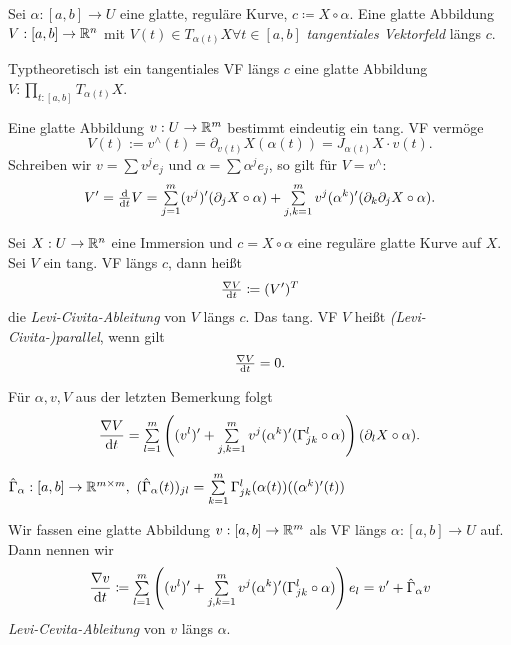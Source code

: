 \documentclass{cheat-sheet}
\let\myProd\prod
\DeclareMathOperator*{\textprod}{{\textstyle \myProd}}
\renewcommand{\prod}{\textprod}
\let\mySum\sum
\DeclareMathOperator*{\textsum}{{\textstyle \mySum}}
\renewcommand{\sum}{\textsum\limits}
\begin{document}

\begin{defn}
  Sei $\alpha : [a, b] \to U$ eine glatte, reguläre Kurve, $c \coloneqq X \circ \alpha$. Eine glatte Abbildung $V : [a, b] \to \mathbb{R}^n$ mit $V(t) \in T_{\alpha(t)} X \forall t \in [a, b]$ \emph{tangentiales Vektorfeld} längs $c$.
\end{defn}

\begin{defn}
  Typtheoretisch ist ein tangentiales VF längs $c$ eine glatte Abbildung $V : \prod_{t : [a, b]} T_{\alpha(t)} X$.
\end{defn}

\begin{bem}
  Eine glatte Abbildung $v : U \to \mathbb{R}^m$ bestimmt eindeutig ein tang. VF vermöge
  \[ V(t) := v^\wedge(t) = \partial_{v(t)} X(\alpha(t)) = J_{\alpha(t)} X \cdot v(t). \]
  Schreiben wir $v = \sum v^j e_j$ und $\alpha = \sum \alpha^j e_j$, so gilt für $V = v^\wedge$:
  \[ V' = \tfrac{\d}{\d t} V = \sum_{j=1}^m (v^j)' (\partial_j X \circ \alpha) + \sum_{j,k=1}^m v^j (\alpha^k)' (\partial_k \partial_j X \circ \alpha). \]
\end{bem}

\begin{defn}
  Sei $X : U \to \mathbb{R}^n$ eine Immersion und $c = X \circ \alpha$ eine reguläre glatte Kurve auf $X$. Sei $V$ ein tang. VF längs $c$, dann heißt
  \[ \tfrac{\nabla V}{\mathrm{d} t} \coloneqq (V')^T \]
  die \emph{Levi-Civita-Ableitung} von $V$ längs $c$. Das tang. VF $V$ heißt \emph{(Levi-Civita-)parallel}, wenn gilt
  \[ \tfrac{\nabla V}{\mathrm{d} t} = 0. \]
\end{defn}

\begin{bem}
  Für $\alpha, v, V$ aus der letzten Bemerkung folgt
  \[ \frac{\nabla V}{\d t} = \sum_{l=1}^m \left( (v^l)' + \sum_{j,k=1}^m v^j (\alpha^k)' (\Gamma_{jk}^l \circ \alpha) \right) (\partial_l X \circ \alpha). \]
\end{bem}

\begin{nota}
  $\hat{\Gamma}_{\alpha} : [a, b] \to \R^{m \times m}, \,\, (\hat{\Gamma}_{\alpha}(t))_{jl} = \sum_{k=1}^m \Gamma_{jk}^l (\alpha(t))((\alpha^k)'(t))$
\end{nota}

\begin{defn}
  Wir fassen eine glatte Abbildung $v : [a, b] \to \mathbb{R}^m$ als VF längs $\alpha : [a, b] \to U$ auf. Dann nennen wir
  \[ \frac{\nabla v}{\d t} \coloneqq \sum_{l=1}^m \left( (v^l)' + \sum_{j,k=1}^m v^j (\alpha^k)' (\Gamma_{jk}^l \circ \alpha) \right) e_l = v' + \hat{\Gamma}_{\alpha} v \]
  \emph{Levi-Cevita-Ableitung} von $v$ längs $\alpha$.
\end{defn}
\end{document}
